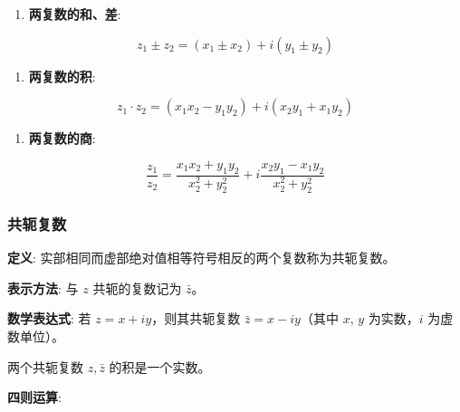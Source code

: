 \begin{enumerate}
\item \textbf{两复数的和、差}:
\end{enumerate}

\begin{equation*}
z_{1} \pm z_{2} = (x_{1} \pm x_{2}) + i(y_{1} \pm y_{2})
\end{equation*}

\begin{enumerate}
\item \textbf{两复数的积}:
\end{enumerate}

\begin{equation*}
z_{1} \cdot z_{2} = (x_{1}x_{2} - y_{1}y_{2}) + i(x_{2}y_{1} + x_{1}y_{2})
\end{equation*}

\begin{enumerate}
\item \textbf{两复数的商}:
\end{enumerate}

\begin{equation*}
\frac{z_{1}}{z_{2}} = \frac{x_{1}x_{2} + y_{1}y_{2}}{x_{2}^{2} + y_{2}^{2}} + i\frac{x_{2}y_{1} - x_{1}y_{2}}{x_{2}^{2} + y_{2}^{2}}
\end{equation*}
\subsubsection{共轭复数}
\label{共轭复数}
\textbf{定义}: 实部相同而虚部绝对值相等符号相反的两个复数称为共轭复数。

\textbf{表示方法}: 与 \(z\) 共轭的复数记为 \(\bar{z}\)。

\textbf{数学表达式}:  若 \(z = x + iy\)，则其共轭复数
\(\bar{z} = x - iy\)（其中 \(x\), \(y\) 为实数，\(i\) 为虚数单位）。

\begin{tcolorbox}[title={Note},colback=red!5!white
,colframe=red!75!black
,colbacktitle=yellow!50!red
,coltitle=red!25!black, fonttitle=\bfseries,subtitle style={boxrule=0.4pt, colback=yellow!50!red!25!white}]
两个共轭复数 \(z,\bar{z}\) 的积是一个实数。

\end{tcolorbox}

\textbf{四则运算}:

